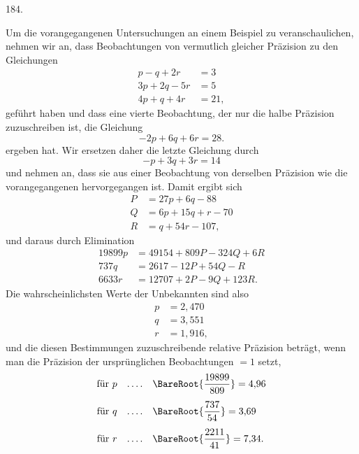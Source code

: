 \begin{center}\hypertarget{native-257-article184}{}184.\end{center}
Um die vorangegangenen Untersuchungen an einem Beispiel zu veranschaulichen, nehmen wir an, dass Beobachtungen von vermutlich gleicher Präzision zu den Gleichungen
\[
\begin{aligned}
p-q+2r&=3\\
3p+2q-5r&=5\\
4p+q+4r&=21,
\end{aligned}
\]
geführt haben und dass eine vierte Beobachtung, der nur die halbe Präzision zuzuschreiben ist, die Gleichung
\[
-2p+6q+6r=28.
\]
ergeben hat. Wir ersetzen daher die letzte Gleichung durch
\[
-p+3q+3r=14
\]
und nehmen an, dass sie aus einer Beobachtung von derselben Präzision wie die vorangegangenen hervorgegangen ist. Damit ergibt sich
\[
\begin{aligned}
P&=27p+6q-88\\
Q&=6p+15q+r-70\\
R&=q+54r-107,
\end{aligned}
\]
und daraus durch Elimination
\[
\begin{aligned}
19899p&=49154+809P-324Q+6R\\
737q&=2617-12P+54Q-R\\
6633r&=12707+2P-9Q+123R.
\end{aligned}
\]
Die wahrscheinlichsten Werte der Unbekannten sind also
\[
\begin{aligned}
p&=2{,}470\\
q&=3{,}551\\
r&=1{,}916,
\end{aligned}
\]
und die diesen Bestimmungen zuzuschreibende relative Präzision beträgt, wenn man die Präzision der ursprünglichen Beobachtungen $=1$ setzt,
\[
\begin{aligned}
\text{für }p\quad .\,.\,.\,.\quad &\BareRoot{\frac{19899}{809}}=4{,}96\\[4pt]
\text{für }q\quad .\,.\,.\,.\quad &\BareRoot{\frac{737}{54}}=3{,}69\\[4pt]
\text{für }r\quad .\,.\,.\,.\quad &\BareRoot{\frac{2211}{41}}=7{,}34.
\end{aligned}
\]

